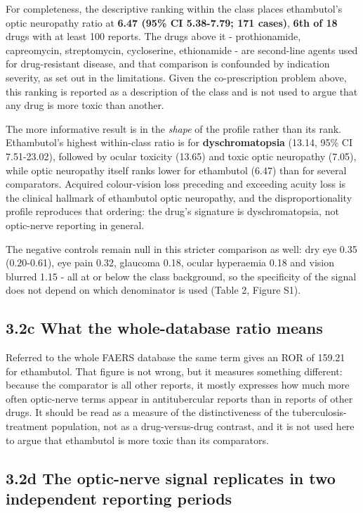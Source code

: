 \documentclass[utf8]{FrontiersinVancouver}
\begin{document}
For completeness, the descriptive ranking within the class places ethambutol's optic neuropathy ratio at \textbf{6.47 (95\% CI 5.38-7.79; 171 cases)}, \textbf{6th of 18} drugs with at least 100 reports. The drugs above it - prothionamide, capreomycin, streptomycin, cycloserine, ethionamide - are second-line agents used for drug-resistant disease, and that comparison is confounded by indication severity, as set out in the limitations. Given the co-prescription problem above, this ranking is reported as a description of the class and is not used to argue that any drug is more toxic than another.

The more informative result is in the \textit{shape} of the profile rather than its rank. Ethambutol's highest within-class ratio is for \textbf{dyschromatopsia} (13.14, 95\% CI 7.51-23.02), followed by ocular toxicity (13.65) and toxic optic neuropathy (7.05), while optic neuropathy itself ranks lower for ethambutol (6.47) than for several comparators. Acquired colour-vision loss preceding and exceeding acuity loss is the clinical hallmark of ethambutol optic neuropathy, and the disproportionality profile reproduces that ordering: the drug's signature is dyschromatopsia, not optic-nerve reporting in general.

The negative controls remain null in this stricter comparison as well: dry eye 0.35 (0.20-0.61), eye pain 0.32, glaucoma 0.18, ocular hyperaemia 0.18 and vision blurred 1.15 - all at or below the class background, so the specificity of the signal does not depend on which denominator is used (Table 2, Figure S1).

\subsection{3.2c What the whole-database ratio means}

Referred to the whole FAERS database the same term gives an ROR of 159.21 for ethambutol. That figure is not wrong, but it measures something different: because the comparator is all other reports, it mostly expresses how much more often optic-nerve terms appear in antitubercular reports than in reports of other drugs. It should be read as a measure of the distinctiveness of the tuberculosis-treatment population, not as a drug-versus-drug contrast, and it is not used here to argue that ethambutol is more toxic than its comparators.

\subsection{3.2d The optic-nerve signal replicates in two independent reporting periods}
\end{document}
